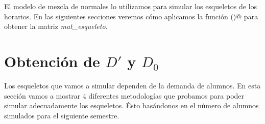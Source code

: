                                                                                                                                                                                                                                                                                                                                                                                                                                                                                 El modelo de mezcla de normales lo utilizamos para simular los esqueletos de los horarios. En las siguientes secciones veremos cómo aplicamos la función \verb@normalmixEM()@ para obtener la matriz \textit{mat\_esqueleto}.
                                                                                                                                                                                                                                                                                                                                                                                                                                                                                
                                                                                                                                                                                                                                                                                                                                                                                                                                                                                
                                                                                                                                                                                                                                                                                                                                                                                                                                                                                \section{Obtención de $D'$ y $D_{0}$} \label{GMM_D}

Los esqueletos que vamos a simular dependen de la demanda de alumnos. En esta sección vamos a mostrar 4 diferentes metodologías que probamos para poder simular adecuadamente los esqueletos. Ésto basándonos en el número de alumnos simulados para el siguiente semestre. %


